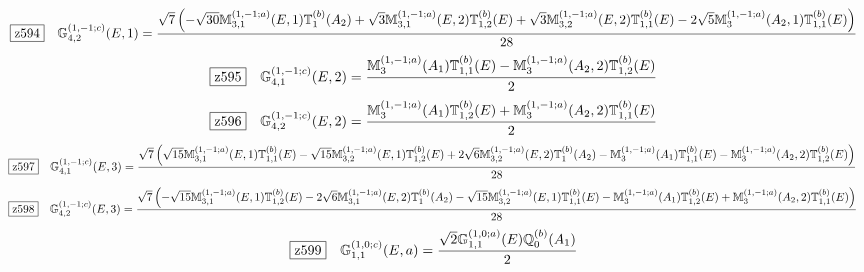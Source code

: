 \documentclass[fleqn,10pt,landscape]{jsarticle}
\begin{document}
\begin{dmath*}
\hspace*{3mm}\fbox{z594}\quad \mathbb{G}_{4,2}^{(1,-1;c)}(E,1)=\frac{\sqrt{7} \left(- \sqrt{30} \mathbb{M}_{3,1}^{(1,-1;a)}(E,1) \mathbb{T}_{1}^{(b)}(A_{2}) + \sqrt{3} \mathbb{M}_{3,1}^{(1,-1;a)}(E,2) \mathbb{T}_{1,2}^{(b)}(E) + \sqrt{3} \mathbb{M}_{3,2}^{(1,-1;a)}(E,2) \mathbb{T}_{1,1}^{(b)}(E) - 2 \sqrt{5} \mathbb{M}_{3}^{(1,-1;a)}(A_{2},1) \mathbb{T}_{1,1}^{(b)}(E)\right)}{28}
\end{dmath*}
\begin{dmath*}
\hspace*{3mm}\fbox{z595}\quad \mathbb{G}_{4,1}^{(1,-1;c)}(E,2)=\frac{\mathbb{M}_{3}^{(1,-1;a)}(A_{1}) \mathbb{T}_{1,1}^{(b)}(E) - \mathbb{M}_{3}^{(1,-1;a)}(A_{2},2) \mathbb{T}_{1,2}^{(b)}(E)}{2}
\end{dmath*}
\begin{dmath*}
\hspace*{3mm}\fbox{z596}\quad \mathbb{G}_{4,2}^{(1,-1;c)}(E,2)=\frac{\mathbb{M}_{3}^{(1,-1;a)}(A_{1}) \mathbb{T}_{1,2}^{(b)}(E) + \mathbb{M}_{3}^{(1,-1;a)}(A_{2},2) \mathbb{T}_{1,1}^{(b)}(E)}{2}
\end{dmath*}
\begin{dmath*}
\hspace*{3mm}\fbox{z597}\quad \mathbb{G}_{4,1}^{(1,-1;c)}(E,3)=\frac{\sqrt{7} \left(\sqrt{15} \mathbb{M}_{3,1}^{(1,-1;a)}(E,1) \mathbb{T}_{1,1}^{(b)}(E) - \sqrt{15} \mathbb{M}_{3,2}^{(1,-1;a)}(E,1) \mathbb{T}_{1,2}^{(b)}(E) + 2 \sqrt{6} \mathbb{M}_{3,2}^{(1,-1;a)}(E,2) \mathbb{T}_{1}^{(b)}(A_{2}) - \mathbb{M}_{3}^{(1,-1;a)}(A_{1}) \mathbb{T}_{1,1}^{(b)}(E) - \mathbb{M}_{3}^{(1,-1;a)}(A_{2},2) \mathbb{T}_{1,2}^{(b)}(E)\right)}{28}
\end{dmath*}
\begin{dmath*}
\hspace*{3mm}\fbox{z598}\quad \mathbb{G}_{4,2}^{(1,-1;c)}(E,3)=\frac{\sqrt{7} \left(- \sqrt{15} \mathbb{M}_{3,1}^{(1,-1;a)}(E,1) \mathbb{T}_{1,2}^{(b)}(E) - 2 \sqrt{6} \mathbb{M}_{3,1}^{(1,-1;a)}(E,2) \mathbb{T}_{1}^{(b)}(A_{2}) - \sqrt{15} \mathbb{M}_{3,2}^{(1,-1;a)}(E,1) \mathbb{T}_{1,1}^{(b)}(E) - \mathbb{M}_{3}^{(1,-1;a)}(A_{1}) \mathbb{T}_{1,2}^{(b)}(E) + \mathbb{M}_{3}^{(1,-1;a)}(A_{2},2) \mathbb{T}_{1,1}^{(b)}(E)\right)}{28}
\end{dmath*}
\begin{dmath*}
\hspace*{3mm}\fbox{z599}\quad \mathbb{G}_{1,1}^{(1,0;c)}(E,a)=\frac{\sqrt{2} \mathbb{G}_{1,1}^{(1,0;a)}(E) \mathbb{Q}_{0}^{(b)}(A_{1})}{2}
\end{dmath*}
\end{document}
